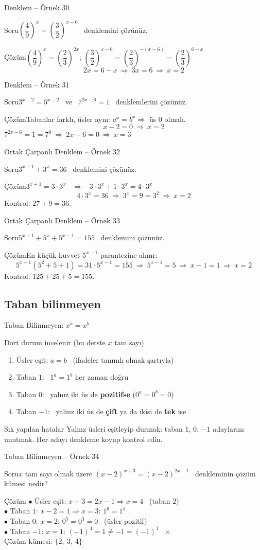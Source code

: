 \documentclass[aspectratio=169,11pt,handout]{beamer}
\newcommand{\soru}[3]{%
\begin{frame}{#1}
  \begin{block}{Soru}\large #2\end{block}
  \pause
  \begin{exampleblock}{Çözüm}\large #3\end{exampleblock}
\end{frame}}
\begin{document}
\soru{Denklem -- Örnek 30}
{\(\left(\dfrac49\right)^{x}=\left(\dfrac32\right)^{x-6}\) \ denklemini çözünüz.}
{\(\left(\dfrac49\right)^{x}=\left(\dfrac23\right)^{2x}\); \qquad \(\left(\dfrac32\right)^{x-6}=\left(\dfrac23\right)^{-(x-6)}=\left(\dfrac23\right)^{6-x}\)
\[2x=6-x\ \Rightarrow\ 3x=6\ \Rightarrow\ x=2\]}

\soru{Denklem -- Örnek 31}
{\(3^{x-2}=5^{x-2}\) \ ve \ \(7^{2x-6}=1\) \ denklemlerini çözünüz.}
{Tabanlar farklı, üsler aynı: \(a^x=b^x\Rightarrow\) üs \(0\) olmalı.
\[x-2=0\ \Rightarrow\ x=2\]
\(7^{2x-6}=1=7^0\ \Rightarrow\ 2x-6=0\ \Rightarrow\ x=3\)}

\soru{Ortak Çarpanlı Denklem -- Örnek 32}
{\(3^{x+1}+3^{x}=36\) \ denklemini çözünüz.}
{\(3^{x+1}=3\cdot 3^x\) \ \(\Rightarrow\) \ \(3\cdot 3^x+1\cdot 3^x=4\cdot 3^x\)
\[4\cdot 3^x=36\ \Rightarrow\ 3^x=9=3^2\ \Rightarrow\ x=2\]
Kontrol: \(27+9=36\).}

\soru{Ortak Çarpanlı Denklem -- Örnek 33}
{\(5^{x+1}+5^{x}+5^{x-1}=155\) \ denklemini çözünüz.}
{En küçük kuvvet \(5^{x-1}\) parantezine alınır:
\[5^{x-1}(5^2+5+1)=31\cdot 5^{x-1}=155\ \Rightarrow\ 5^{x-1}=5\ \Rightarrow\ x-1=1\ \Rightarrow\ x=2\]
Kontrol: \(125+25+5=155\).}

\subsection{Taban bilinmeyen}
\begin{frame}{Taban Bilinmeyen: \(x^a=x^b\)}
\begin{block}{Dört durum incelenir (bu derste \(x\) tam sayı)}
\begin{enumerate}
\item Üsler eşit: \(a=b\) \ (ifadeler tanımlı olmak şartıyla)
\item Taban \(1\): \ \(1^a=1^b\) her zaman doğru
\item Taban \(0\): \ yalnız iki üs de \textbf{pozitifse} (\(0^a=0^b=0\))
\item Taban \(-1\): \ yalnız iki üs de \textbf{çift} ya da ikisi de \textbf{tek} ise
\end{enumerate}
\end{block}
\begin{alertblock}{Sık yapılan hatalar}
Yalnız üsleri eşitleyip durmak: taban \(1\), \(0\), \(-1\) adaylarını unutmak. Her adayı denkleme koyup kontrol edin.
\end{alertblock}
\end{frame}

\soru{Taban Bilinmeyen -- Örnek 34}
{\(x\) tam sayı olmak üzere \((x-2)^{x+3}=(x-2)^{2x-1}\) \ denkleminin çözüm kümesi nedir?}
{\normalsize
\(\bullet\) Üsler eşit: \(x+3=2x-1\Rightarrow x=4\) \ (taban \(2\)) \checkmark\\[2pt]
\(\bullet\) Taban \(1\): \(x-2=1\Rightarrow x=3\): \(1^6=1^5\) \checkmark\\[2pt]
\(\bullet\) Taban \(0\): \(x=2\): \(0^5=0^3=0\) \ (üsler pozitif) \checkmark\\[2pt]
\(\bullet\) Taban \(-1\): \(x=1\): \((-1)^4=1\neq -1=(-1)^1\) \ \(\times\)\\[4pt]
\large Çözüm kümesi: \(\{2,\ 3,\ 4\}\)}
\end{document}
